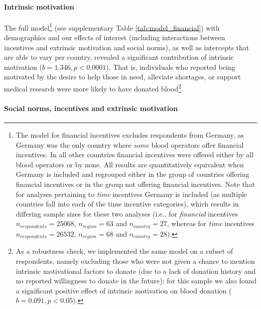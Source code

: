 \documentclass[AER]{AEA}
\begin{document}
\paragraph{Intrinsic motivation}

The full model\footnote{The model for financial incentives excludes respondents from Germany, as Germany was the only country where \textit{some} blood operators offer financial incentives. In all other countries financial incentives were offered either by all blood operators or by none. All results are quantitatively equivalent when Germany is included and regrouped either in the group of countries offering financial incentives or in the group not offering financial incentives. Note that for analyses pertaining to \textit{time} incentives Germany is included (as multiple countries fall into each of the time incentive categories), which results in differing sample sizes for these two analyses (i.e., for \textit{financial} incentives $n_{respondents} = 25068$, $n_{region} = 63$ and $n_{country} = 27$, whereas for \textit{time} incentives $n_{respondents} = 26532$, $n_{region} = 68$ and $n_{country} = 28$).} (see supplementary Table \ref{tab:model_financial}) with demographics and our effects of interest (including interactions between incentives and extrinsic motivation and social norms), as well as intercepts that are able to vary per country, revealed a significant contribution of intrinsic motivation ($b = 1.346, p < 0.0001$). That is, individuals who reported being motivated by the desire to help those in need, alleviate shortages, or support medical research were more likely to have donated blood\footnote{As a robustness check, we implemented the same model on a subset of respondents, namely excluding those who were not given a chance to mention intrinsic motivational factors to donate (due to a lack of donation history and no reported willingness to donate in the future); for this sample we also found a significant positive effect of intrinsic motivation on blood donation ($b = 0.091, p < 0.05)$.}.

\paragraph{Social norms, incentives and extrinsic motivation}
\end{document}
